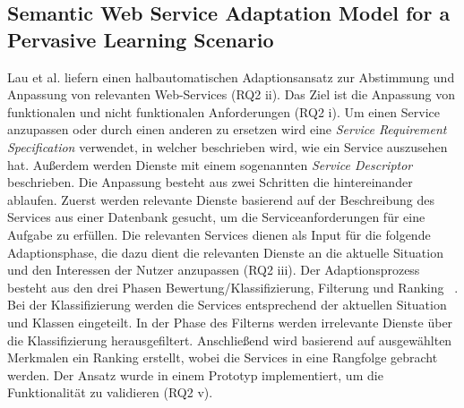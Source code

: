 \documentclass[conference,compsoc]{IEEEtran}
\begin{document}
\subsection{Semantic Web Service Adaptation Model for a Pervasive Learning Scenario}
Lau et al.\cite{lau2008semantic} liefern einen halbautomatischen Adaptionsansatz zur Abstimmung und Anpassung von relevanten Web-Services (RQ2 ii). Das Ziel ist die Anpassung von funktionalen und nicht funktionalen Anforderungen (RQ2 i). Um einen Service anzupassen oder durch einen anderen zu ersetzen wird eine \textit{Service Requirement Specification} verwendet, in welcher beschrieben wird, wie ein Service auszusehen hat. Außerdem werden Dienste mit einem sogenannten \textit{Service Descriptor} beschrieben. Die Anpassung besteht aus zwei Schritten die hintereinander ablaufen. Zuerst werden relevante Dienste basierend auf der Beschreibung des Services aus einer Datenbank gesucht, um die Serviceanforderungen für eine Aufgabe zu erfüllen. Die relevanten Services dienen als Input für die folgende Adaptionsphase, die dazu dient die relevanten Dienste an die aktuelle Situation und den Interessen der Nutzer anzupassen (RQ2 iii). Der Adaptionsprozess besteht aus den drei Phasen Bewertung/Klassifizierung, Filterung und Ranking ~\cite{lau2008semantic}. Bei der Klassifizierung werden die Services entsprechend der aktuellen Situation und Klassen eingeteilt. In der Phase des Filterns werden irrelevante Dienste über die Klassifizierung herausgefiltert. Anschließend wird basierend auf ausgewählten Merkmalen ein Ranking erstellt, wobei die Services in eine Rangfolge gebracht werden.
Der Ansatz wurde in einem Prototyp implementiert, um die Funktionalität zu validieren (RQ2 v).
\end{document}
